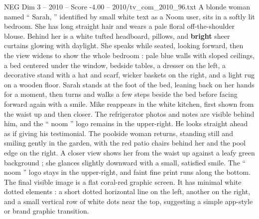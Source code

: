\begin{textsample}{NEG Dim 3 – 2010 – Score -4.00 – 2010/tv\_com\_2010\_96.txt}
A blonde woman named “ Sarah, ” identified by small white text as a Noom user, sits in a softly lit bedroom.
She has long straight hair and wears a pale floral off-the-shoulder blouse.
Behind her is a white tufted headboard, pillows, and \textbf{bright} sheer curtains glowing with daylight.
She speaks while seated, looking forward, then the view widens to show the whole bedroom : pale blue walls with sloped ceilings, a bed centered under the window, bedside tables, a dresser on the left, a decorative stand with a hat and scarf, wicker baskets on the right, and a light rug on a wooden floor.
Sarah stands at the foot of the bed, leaning back on her hands for a moment, then turns and walks a few steps beside the bed before facing forward again with a smile.
Mike reappears in the white kitchen, first shown from the waist up and then closer.
The refrigerator photos and notes are visible behind him, and the “ noom ” logo remains in the upper-right.
He looks straight ahead as if giving his testimonial.
The poolside woman returns, standing still and smiling gently in the garden, with the red patio chairs behind her and the pool edge on the right.
A closer view shows her from the waist up against a leafy green background ; she glances slightly downward with a small, satisfied smile.
The “ noom ” logo stays in the upper-right, and faint fine print runs along the bottom.
The final visible image is a flat coral-red graphic screen.
It has minimal white dotted elements : a short dotted horizontal line on the left, another on the right, and a small vertical row of white dots near the top, suggesting a simple app-style or brand graphic transition.

\end{textsample}
